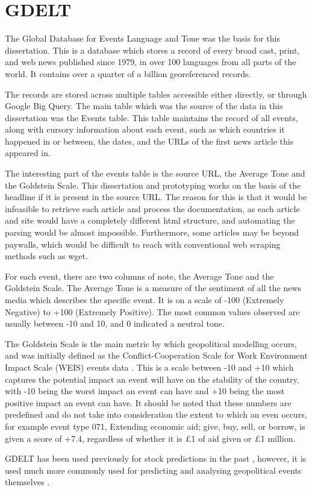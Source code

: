 \section{GDELT}

The Global Database for Events Language and Tone was the basis for this dissertation. This is a database which stores a record of every broad cast, print, and web news published since 1979, in over 100 languages from all parts of the world. It contains over a quarter of a billion georeferenced records. 

The records are stored across multiple tables accessible either directly, or through Google Big Query. The main table which was the source of the data in this dissertation was the Events table. This table maintains the record of all events, along with cursory information about each event, such as which countries it happened in or between, the dates, and the URLs of the first news article this appeared in.

The interesting part of the events table is the source URL, the Average Tone and the Goldstein Scale. This dissertation and prototyping works on the basis of the headline if it is present in the source URL. The reason for this is that it would be infeasible to retrieve each article and process the documentation, as each article and site would have a completely different html structure, and automating the parsing would be almost impossible. Furthermore, some articles may be beyond paywalls, which would be difficult to reach with conventional web scraping methods such as wget.

For each event, there are two columns of note, the Average Tone and the Goldstein Scale. The Average Tone is a measure of the sentiment of all the news media which describes the specific event. It is on a scale of -100 (Extremely Negative) to +100 (Extremely Positive). The most common values observed are usually between -10 and 10, and 0 indicated a neutral tone. 

The Goldstein Scale is the main metric by which geopolitical modelling occurs, and was initially defined as the Conflict-Cooperation Scale for Work Environment Impact Scale (WEIS) events data \cite{goldstein1992conflict}. This is a scale between -10 and +10 which captures the potential impact an event will have on the stability of the country, with -10 being the worst impact an event can have and +10 being the most positive impact an event can have. It should be noted that these numbers are predefined and do not take into consideration the extent to which an even occurs, for example event type 071, Extending economic aid; give, buy, sell, or borrow, is given a score of +7.4, regardless of whether it is £1 of aid given or £1 million. 

GDELT has been used previously for stock predictions in the past \cite{memari2017predicting} \cite{alamro2019predicting}, however, it is used much more commonly used for predicting and analysing geopolitical events themselves \cite{qiao2017predicting} \cite{yonamine2013predicting}. 